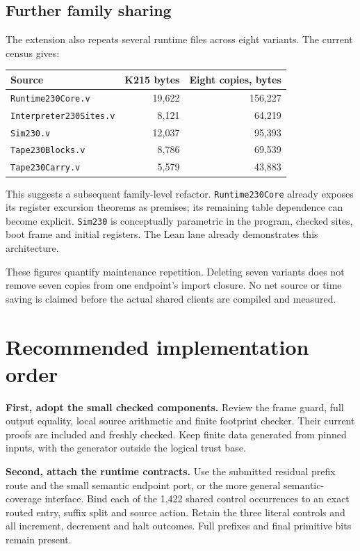 \subsection{Further family sharing}
The extension also repeats several runtime files across eight variants. The current census gives:
\begin{center}
\begin{tabular}{@{}lrr@{}}
\toprule Source & K215 bytes & Eight copies, bytes\\\midrule
\texttt{Runtime230Core.v} & 19,622 & 156,227\\
\texttt{Interpreter230Sites.v} & 8,121 & 64,219\\
\texttt{Sim230.v} & 12,037 & 95,393\\
\texttt{Tape230Blocks.v} & 8,786 & 69,539\\
\texttt{Tape230Carry.v} & 5,579 & 43,883\\
\bottomrule
\end{tabular}
\end{center}
This suggests a subsequent family-level refactor. \texttt{Runtime230Core} already exposes its register excursion theorems as premises; its remaining table dependence can become explicit. \texttt{Sim230} is conceptually parametric in the program, checked sites, boot frame and initial registers. The Lean lane already demonstrates this architecture.

These figures quantify maintenance repetition. Deleting seven variants does not remove seven copies from one endpoint's import closure. No net source or time saving is claimed before the actual shared clients are compiled and measured.

\section{Recommended implementation order}
\textbf{First, adopt the small checked components.} Review the frame guard, full output equality, local source arithmetic and finite footprint checker. Their current proofs are included and freshly checked. Keep finite data generated from pinned inputs, with the generator outside the logical trust base.

\textbf{Second, attach the runtime contracts.} Use the submitted residual prefix route and the small semantic endpoint port, or the more general semantic-coverage interface. Bind each of the 1,422 shared control occurrences to an exact routed entry, suffix split and source action. Retain the three literal controls and all increment, decrement and halt outcomes. Full prefixes and final primitive bits remain present.


